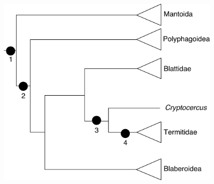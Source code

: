 \begin{multicols}{2}
    \lipsum[1]
\end{multicols}

\begin{figure}[ht]
    \centering
    \includegraphics[scale=0.9]{images/inward_small.pdf}
    \vspace{0.5cm}
    \label{fig:inward1}
\end{figure}

\begin{multicols}{2}
    \lipsum[1-6]
\end{multicols}